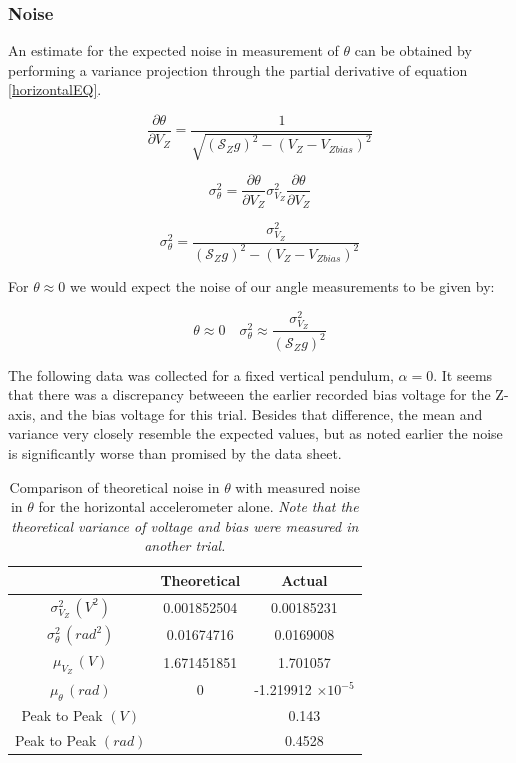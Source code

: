 \documentclass{article}
\theoremstyle{plain}
\theoremstyle{definition}
\theoremstyle{remark}
\newcommand{\Sens}{\mathcal{S}}
\providecommand{\e}[1]{\ensuremath{\times 10^{#1}}}
\begin{document}
\subsubsection{Noise}

An estimate for the expected noise in measurement of $\theta$ can be obtained by performing a variance projection through the partial derivative of equation \ref{horizontalEQ}.

$$ \frac{\partial \theta}{\partial V_{Z}} =  \frac{1}{\sqrt{(\Sens_{Z} g)^2 - (V_{Z} - V_{Zbias})^2}}$$

$$ \sigma^2_{\theta} = \frac{\partial \theta}{\partial V_{Z}} \sigma^2_{V_{Z}} \frac{\partial \theta}{\partial V_{Z}} $$

$$ \sigma^2_{\theta} = \frac{\sigma^2_{V_{Z}}}{(\Sens_{Z} g)^2 - (V_{Z} - V_{Zbias})^2}$$

For $\theta \approx 0$ we would expect the noise of our angle measurements to be given by:

$$ \theta \approx 0 \quad \sigma^2_{\theta} \approx \frac{\sigma^2_{V_{Z}}}{(\Sens_{Z} g)^2}$$

The following data was collected for a fixed vertical pendulum, $\alpha = 0$.  It seems that there was a discrepancy betweeen the earlier recorded bias voltage for the Z-axis, and the bias voltage for this trial.  Besides that difference, the mean and variance very closely resemble the expected values, but as noted earlier the noise is significantly worse than promised by the data sheet.  

\begin{table}
\begin{center}
    \begin{tabular}{|c|c|c|}
        \hline
        ~                   & Theoretical  & Actual \\ \hline
        $\sigma^2_{V_{Z}} \, (V^2)$    & 0.001852504            &  0.00185231      \\ 
        $\sigma^2_{\theta} \, (rad^2)$ & 0.01674716            & 0.0169008      \\ 
        $\mu_{V_{Z}} \, (V)$       & 1.671451851            &  1.701057      \\ 
        $\mu_{\theta} \, (rad)$      & 0            &  -1.219912 \e{-5}     \\
        Peak to Peak $(V)$ & ~ & 0.143 \\
        Peak to Peak $(rad)$ & ~ & 0.4528 \\
        \hline
    \end{tabular}
\caption{Comparison of theoretical noise in $\theta$ with measured noise in $\theta$ for the horizontal accelerometer alone. \emph{Note that the theoretical variance of voltage and bias were measured in another trial.}}
\label{Noise_horizontal_T}
\end{center}
\end{table}
\end{document}

